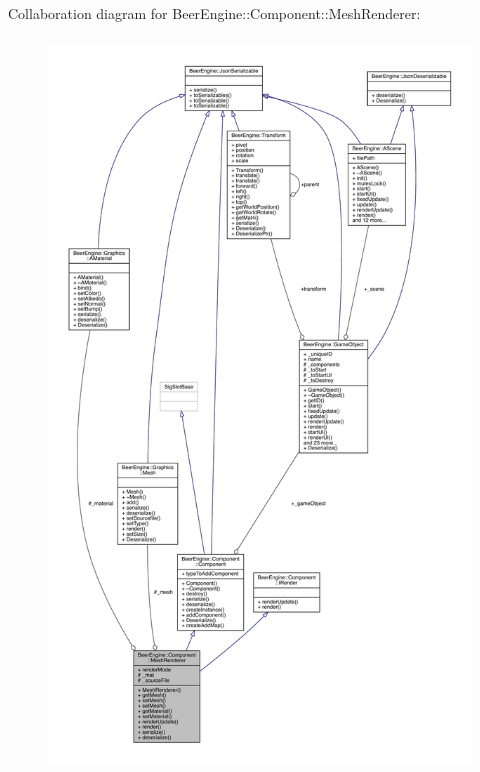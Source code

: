 Collaboration diagram for Beer\+Engine\+:\+:Component\+:\+:Mesh\+Renderer\+:\nopagebreak
\begin{figure}[H]
\begin{center}
\leavevmode
\includegraphics[height=550pt]{class_beer_engine_1_1_component_1_1_mesh_renderer__coll__graph}
\end{center}
\end{figure}
